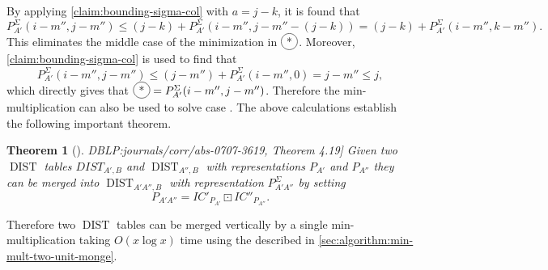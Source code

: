 \documentclass[twoside,11pt,openright]{report}
\newcommand{\DIST}{\operatorname{DIST}}
\newcommand*{\circled}[1]{\tikz[baseline=(char.base)]{
                          \node[shape=circle,draw,inner sep=2pt] (char) {#1};}}
\newcommand{\refbook}[2]{\cite[#1]{DBLP:journals/corr/abs-0707-3619}, #2}
\newtheorem{theorem}{Theorem}
\begin{document}
By applying \cref{claim:bounding-sigma-col} with $a = j - k$, it is found that
\[
  P_{A'}^{\Sigma}(i - m'', j - m'') \leq (j - k) + P_{A'}^{\Sigma}(i - m'', j - m'' - (j - k)) = (j - k) + P_{A'}^{\Sigma}(i - m'', k - m'').
\]
This eliminates the middle case of the minimization in $\circled{*}$. Moreover, \cref{claim:bounding-sigma-col} is used to find that
\[
  P_{A'}^{\Sigma}(i - m'', j - m'') \leq (j - m'') + P_{A'}^{\Sigma}(i - m'', 0) = j - m'' \leq j,
\]
which directly gives that $\circled{*} = P_{A'}^{\Sigma}(i - m'', j - m'')$. Therefore the min-multiplication can also be used to solve case \circled{2}. The above calculations establish the following important theorem.
\begin{theorem}[\refbook{p.-55}{Theorem 4.19}]
  \label{thm:dist-vertical-merge}
  Given two $\DIST$ tables $DIST_{A',B}$ and $\DIST_{A'',B}$ with representations $P_{A'}$ and $P_{A''}$ they can be merged into $\DIST_{A'A'',B}$ with representation $P_{A'A''}^{\Sigma}$ by setting
  \[
    P_{A'A''} = IC'_{P_{A'}} \boxdot IC''_{P_{A''}} .
  \]
\end{theorem}

 Therefore two $\DIST$ tables can be merged vertically by a single min-multiplication taking $O(x \log{x})$ time using the described in \cref{sec:algorithm:min-mult-two-unit-monge}.
\end{document}
